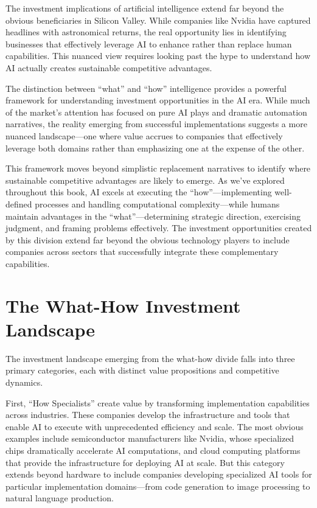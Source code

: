 \documentclass[
  Letterpaper,
]{scrbook}
\begin{document}
The investment implications of artificial intelligence extend far beyond
the obvious beneficiaries in Silicon Valley. While companies like Nvidia
have captured headlines with astronomical returns, the real opportunity
lies in identifying businesses that effectively leverage AI to enhance
rather than replace human capabilities. This nuanced view requires
looking past the hype to understand how AI actually creates sustainable
competitive advantages.

The distinction between ``what'' and ``how'' intelligence provides a
powerful framework for understanding investment opportunities in the AI
era. While much of the market's attention has focused on pure AI plays
and dramatic automation narratives, the reality emerging from successful
implementations suggests a more nuanced landscape---one where value
accrues to companies that effectively leverage both domains rather than
emphasizing one at the expense of the other.

This framework moves beyond simplistic replacement narratives to
identify where sustainable competitive advantages are likely to emerge.
As we've explored throughout this book, AI excels at executing the
``how''---implementing well-defined processes and handling computational
complexity---while humans maintain advantages in the
``what''---determining strategic direction, exercising judgment, and
framing problems effectively. The investment opportunities created by
this division extend far beyond the obvious technology players to
include companies across sectors that successfully integrate these
complementary capabilities.

\section{The What-How Investment
Landscape}\label{the-what-how-investment-landscape}

The investment landscape emerging from the what-how divide falls into
three primary categories, each with distinct value propositions and
competitive dynamics.

First, ``How Specialists'' create value by transforming implementation
capabilities across industries. These companies develop the
infrastructure and tools that enable AI to execute with unprecedented
efficiency and scale. The most obvious examples include semiconductor
manufacturers like Nvidia, whose specialized chips dramatically
accelerate AI computations, and cloud computing platforms that provide
the infrastructure for deploying AI at scale. But this category extends
beyond hardware to include companies developing specialized AI tools for
particular implementation domains---from code generation to image
processing to natural language production.
\end{document}
